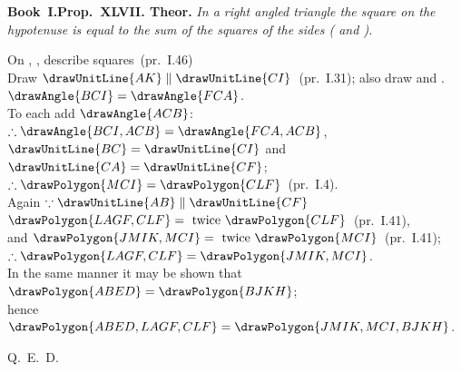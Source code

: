 \documentclass[12pt]{article}\usepackage{geometry}\geometry{a5paper,margin=1.5cm}
\begin{document}
\begin{minipage}[t]{0.52\linewidth}\vspace{0pt}%
\textbf{Book~I.\enspace Prop.\ XLVII. Theor.}
\medskip\noindent\itshape
In a right angled triangle  the
square on the hypotenuse  is equal to the sum
of the squares of the sides ( and
).
\noindent\upshape\footnotesize\begin{center}
On , , 
describe squares~(pr.~I.46)\\
Draw $\drawUnitLine{AK}\parallel\drawUnitLine{CI}$~(pr.~I.31);
also draw  and .\\
$\drawAngle{BCI}=\drawAngle{FCA}$.\\
To each add $\drawAngle{ACB}$:
$\therefore \drawAngle{BCI,ACB}=\drawAngle{FCA,ACB}$,\\
$\drawUnitLine{BC}=\drawUnitLine{CI}$ and $\drawUnitLine{CA}=\drawUnitLine{CF}$;\\
$\therefore \drawPolygon{MCI}=\drawPolygon{CLF}$~(pr.~I.4).\\
Again $\because \drawUnitLine{AB}\parallel\drawUnitLine{CF}$\\
$\drawPolygon{LAGF,CLF}=\mbox{ twice }\drawPolygon{CLF}$~(pr.~I.41),\\
and $\drawPolygon{JMIK,MCI}=\mbox{ twice }\drawPolygon{MCI}$~(pr.~I.41);\\
$\therefore \drawPolygon{LAGF,CLF}=\drawPolygon{JMIK,MCI}$.\\
In the same manner it may be shown that\\
$\drawPolygon{ABED}=\drawPolygon{BJKH}$;\\
hence $\drawPolygon{ABED,LAGF,CLF}=\drawPolygon{JMIK,MCI,BJKH}$.
\end{center}
\begin{flushright}Q.\ E.\ D.\end{flushright}
\end{minipage}
\end{document}
